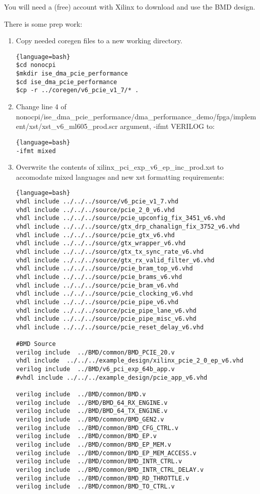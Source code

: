 You will need a (free) account with Xilinx to download and use the BMD design.  

There is some prep work:
\begin{enumerate}

\item Copy needed coregen files to a new working directory.
\begin{lstlisting}{language=bash}
$cd nonocpi
$mkdir ise_dma_pcie_performance
$cd ise_dma_pcie_performance
$cp -r ../coregen/v6_pcie_v1_7/* .
\end{lstlisting}

\item Change line 4 of nonocpi/ise\_dma\_pcie\_performance/dma\_performance\_demo/fpga/implement/xst/xst\_v6\_ml605\_prod.scr argument, -ifmt VERILOG to:
\begin{lstlisting}{language=bash}
-ifmt mixed
\end{lstlisting}

\item Overwrite the contents of xilinx\_pci\_exp\_v6\_ep\_inc\_prod.xst to accomodate mixed languages and new xst formatting requirements:
\begin{lstlisting}{language=bash}
vhdl include ../../../source/v6_pcie_v1_7.vhd
vhdl include ../../../source/pcie_2_0_v6.vhd
vhdl include ../../../source/pcie_upconfig_fix_3451_v6.vhd
vhdl include ../../../source/gtx_drp_chanalign_fix_3752_v6.vhd 
vhdl include ../../../source/pcie_gtx_v6.vhd
vhdl include ../../../source/gtx_wrapper_v6.vhd
vhdl include ../../../source/gtx_tx_sync_rate_v6.vhd
vhdl include ../../../source/gtx_rx_valid_filter_v6.vhd
vhdl include ../../../source/pcie_bram_top_v6.vhd
vhdl include ../../../source/pcie_brams_v6.vhd
vhdl include ../../../source/pcie_bram_v6.vhd
vhdl include ../../../source/pcie_clocking_v6.vhd
vhdl include ../../../source/pcie_pipe_v6.vhd
vhdl include ../../../source/pcie_pipe_lane_v6.vhd
vhdl include ../../../source/pcie_pipe_misc_v6.vhd
vhdl include ../../../source/pcie_reset_delay_v6.vhd

#BMD Source
verilog include  ../BMD/common/BMD_PCIE_20.v
vhdl include  ../../../example_design/xilinx_pcie_2_0_ep_v6.vhd
verilog include  ../BMD/v6_pci_exp_64b_app.v
#vhdl include ../../../example_design/pcie_app_v6.vhd

verilog include  ../BMD/common/BMD.v
verilog include  ../BMD/BMD_64_RX_ENGINE.v
verilog include  ../BMD/BMD_64_TX_ENGINE.v
verilog include  ../BMD/common/BMD_GEN2.v
verilog include  ../BMD/common/BMD_CFG_CTRL.v
verilog include  ../BMD/common/BMD_EP.v
verilog include  ../BMD/common/BMD_EP_MEM.v
verilog include  ../BMD/common/BMD_EP_MEM_ACCESS.v
verilog include  ../BMD/common/BMD_INTR_CTRL.v
verilog include  ../BMD/common/BMD_INTR_CTRL_DELAY.v
verilog include  ../BMD/common/BMD_RD_THROTTLE.v
verilog include  ../BMD/common/BMD_TO_CTRL.v
\end{lstlisting}


\end{enumerate}
